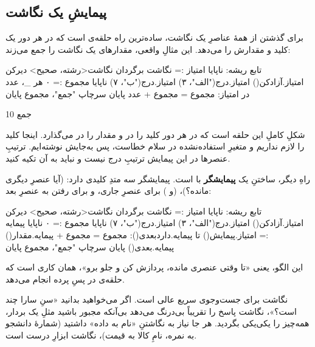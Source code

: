 \subsection{پیمایشِ یک نگاشت}

برای گذشتن از همهٔ عناصرِ یک نگاشت، ساده‌ترین راه حلقه‌ی  است که در
هر دور یک کلید و مقدارش را می‌دهد. این مثالِ واقعی، مقدارهای یک نگاشت را جمع
می‌زند:

\begin{salamfa}
تابع ریشه:
    ناپایا امتیاز := نگاشت {} برگردان نگاشت<رشته، صحیح>
    دیرکن امتیاز.آزادکن()
    امتیاز.درج("الف"، ۳)
    امتیاز.درج("ب"، ۷)
    ناپایا مجموع := ۰
    هر _، عدد در امتیاز:
        مجموع = مجموع + عدد
    پایان
    سرچاپ "جمع"، مجموع
پایان
\end{salamfa}

\begin{progoutfa}
جمع 10
\end{progoutfa}

شکلِ کاملِ این حلقه  است که در هر دور کلید را در
 و مقدار را در  می‌گذارد. اینجا کلید را لازم نداریم و متغیرِ
استفاده‌نشده در سلام خطاست، پس به‌جایش \code{\_} نوشته‌ایم. ترتیبِ عنصرها در این پیمایش ترتیبِ درج نیست و نباید
به آن تکیه کنید.

راهِ دیگر، ساختنِ یک \textbf{پیمایشگر} با  است. پیمایشگر سه متدِ
کلیدی دارد:  (آیا عنصرِ دیگری مانده؟)،  (و
) برای عنصرِ جاری، و  برای رفتن به عنصرِ بعد:

\begin{salamfa}
تابع ریشه:
    ناپایا امتیاز := نگاشت {} برگردان نگاشت<رشته، صحیح>
    دیرکن امتیاز.آزادکن()
    امتیاز.درج("الف"، ۳)
    امتیاز.درج("ب"، ۷)
    ناپایا مجموع := ۰
    ناپایا پیمایه := امتیاز.پیمایش()
    تا پیمایه.داردبعدی():
        مجموع = مجموع + پیمایه.مقدار()
        پیمایه.بعدی()
    پایان
    سرچاپ "جمع"، مجموع
پایان
\end{salamfa}

این الگو، یعنی «تا وقتی عنصری مانده، پردازش کن و جلو برو»، همان کاری است که
حلقه‌ی  در پسِ پرده انجام می‌دهد.

\begin{tip}
نگاشت برای جست‌وجوی سریع عالی است. اگر می‌خواهید بدانید «سنِ سارا چند است؟»،
نگاشت پاسخ را تقریباً بی‌درنگ می‌دهد بی‌آنکه مجبور باشید مثلِ یک بردار،
همه‌چیز را یکی‌یکی بگردید. هر جا نیاز به نگاشتنِ «نام به داده» داشتید (شمارهٔ
دانشجو به نمره، نامِ کالا به قیمت)، نگاشت ابزارِ درست است.
\end{tip}

